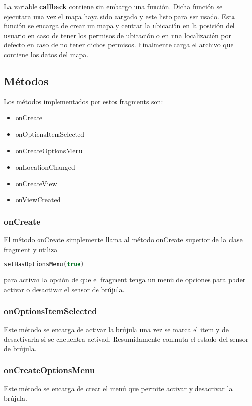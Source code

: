 La variable \textbf{callback} contiene sin embargo una función. Dicha función se ejecutara una vez el mapa haya sido cargado y este listo para ser usado. Esta función se encarga de crear un mapa y centrar la ubicación en la posición del usuario en caso de tener los permisos de ubicación o en una localización por defecto en caso de no tener dichos permisos. Finalmente carga el archivo que contiene los datos del mapa.

\newpage

\subsection{Métodos}
Los métodos implementados por estos fragments son:

\begin{itemize}
	\item onCreate
	\item onOptionsItemSelected
	\item onCreateOptionsMenu
	\item onLocationChanged
	\item onCreateView
	\item onViewCreated
\end{itemize}

\subsubsection{onCreate}
El método onCreate simplemente llama al método onCreate superior de la clase fragment y utiliza
\begin{lstlisting}[language=Kotlin]
setHasOptionsMenu(true)
\end{lstlisting}
para activar la opción de que el fragment tenga un menú de opciones para poder activar o desactivar el sensor de brújula.

\subsubsection{onOptionsItemSelected}
Este método se encarga de activar la brújula una vez se marca el item y de desactivarla si se encuentra activad. Resumidamente conmuta el estado del sensor de brújula.

\subsubsection{onCreateOptionsMenu}
Este método se encarga de crear el menú que permite activar y desactivar la brújula.

